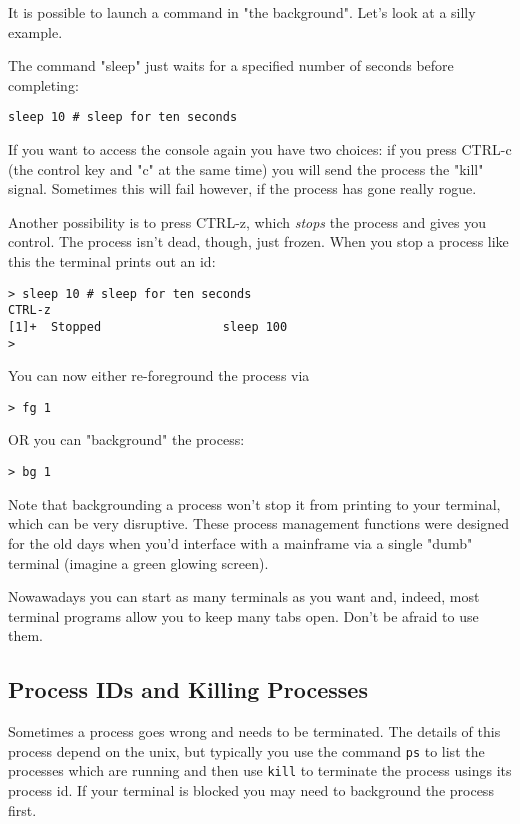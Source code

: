 \documentclass[11pt]{article}
\begin{document}
It is possible to launch a command in "the background". Let's look
at a silly example.

The command "sleep" just waits for a specified number of seconds
before completing:

\begin{verbatim}
sleep 10 # sleep for ten seconds
\end{verbatim}

If you want to access the console again you have two choices: if you
press CTRL-c (the control key and "c" at the same time) you will
send the process the "kill" signal. Sometimes this will fail
however, if the process has gone really rogue.

Another possibility is to press CTRL-z, which \emph{stops} the process
and gives you control. The process isn't dead, though, just
frozen. When you stop a process like this the terminal prints out an
id:

\begin{verbatim}
> sleep 10 # sleep for ten seconds
CTRL-z
[1]+  Stopped                 sleep 100
> 
\end{verbatim}

You can now either re-foreground the process via

\begin{verbatim}
> fg 1
\end{verbatim}

OR you can "background" the process:

\begin{verbatim}
> bg 1
\end{verbatim}

Note that backgrounding a process won't stop it from printing to
your terminal, which can be very disruptive.  These process
management functions were designed for the old days when you'd
interface with a mainframe via a single "dumb" terminal (imagine a
green glowing screen).

Nowawadays you can start as many terminals as you want and, indeed,
most terminal programs allow you to keep many tabs open. Don't be
afraid to use them.

\subsection{Process IDs and Killing Processes}
\label{sec:orgd69abf4}

Sometimes a process goes wrong and needs to be terminated. The
details of this process depend on the unix, but typically you use
the command \texttt{ps} to list the processes which are running and then
use \texttt{kill} to terminate the process usings its process id. If your
terminal is blocked you may need to background the process
first.
\end{document}
